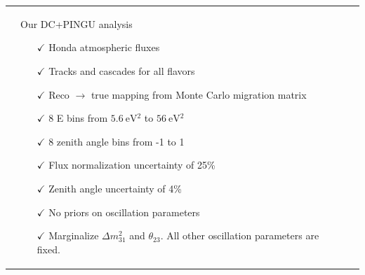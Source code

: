 \documentclass[draft=True]{revtex4-2}
\newcommand{\dm}{\Delta m^2_{31}}
\begin{document}
\begin{tabular}{p{55mm}p{55mm}p{55mm}}
\begin{itemize}
      \end{itemize} &
    Our DC+PINGU analysis
      \begin{itemize}
         \item[$\checkmark$] Honda atmospheric fluxes
         \item[$\checkmark$] Tracks and cascades for all flavors
         \vspace{1em} 
         \item[$\checkmark$] Reco $\to$ true mapping from Monte Carlo migration matrix
         \item[$\checkmark$] 8 E bins from $\SI{5.6}{\electronvolt^2}$ to $\SI{56}{\electronvolt^2}$
         \item[$\checkmark$] 8 zenith angle bins from -1 to 1
         \item[$\checkmark$] Flux normalization uncertainty of 25\%
         \item[$\checkmark$] Zenith angle uncertainty of 4\% 
         \item[$\checkmark$] No priors on oscillation parameters 
         \item[$\checkmark$] Marginalize $\dm$ and $\theta_{23}$. All other oscillation parameters are fixed.
      \end{itemize} 
\end{tabular}



\end{document}
